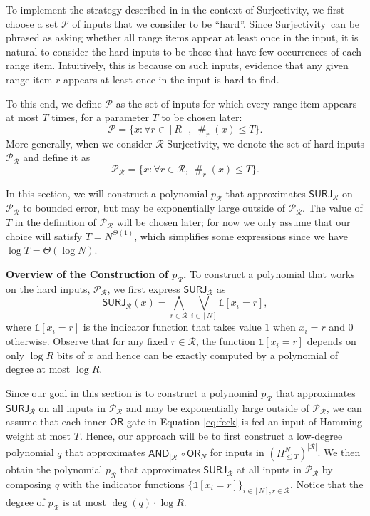\documentclass[11pt, letterpaper, fleqn]{article}
\theoremstyle{plain}
\renewcommand{\P}{\mathcal{P}}
\newcommand{\SURJ}{\mathsf{ SURJ}}
\newcommand{\Surjectivity}{Surjectivity}
\newcommand{\OR}{\mathsf{ OR}}
\newcommand{\id}{{\mathds{1}}}
\newcommand{\Rcal}{\mathcal{R}}
\newcommand{\AND}{\mathsf{AND}}
\newcommand{\fr}{\operatorname{\#}}
\begin{document}
To implement the strategy described in  in the context of \Surjectivity, we first choose a set $\P$ of inputs that we consider to be ``hard''. 
Since \Surjectivity\ can be phrased as asking whether all range items appear at least once in the input, it is natural to consider the hard inputs to be those that have few occurrences of each range item.  Intuitively, this is because on such inputs, evidence that any given range item $r$ appears at least once in the input is hard to find. 

To this end, we define $\mathcal{P}$ as the set of inputs for which every range item appears at most $T$ times, for a parameter $T$ to be chosen later:
\begin{equation}
    \mathcal{P}=\{x:\forall r\in [R],~\fr_r(x)\leq T\}. \label{pdefsurj}
\end{equation}
More generally, when we consider $\Rcal$-\Surjectivity, we denote the set of hard inputs $\P_\Rcal$ and define it as
\begin{equation}
    \P_\Rcal=\{x:\forall r\in \Rcal,~\fr_r(x)\leq T\}.
\end{equation}

In this section, we will construct a polynomial $p_{\mathcal{R}}$ that approximates $\SURJ_\Rcal$ on $\P_\Rcal$ to bounded error, but may be exponentially large outside of $\P_{\Rcal}$. 
The value of $T$ in the definition of $\P_{\Rcal}$ will be chosen later;
for now we only assume that our choice will satisfy $T=N^{\Theta(1)}$, which simplifies some expressions since we have $\log T = \Theta(\log N)$.

\medskip \noindent \textbf{Overview of the Construction of $p_{\mathcal{R}}$.} To construct a polynomial that works on the hard inputs, $\P_\Rcal$, we first express $\SURJ_\Rcal$ as 
\begin{equation}
    \SURJ_\Rcal(x) = \bigwedge_{r\in\Rcal} \bigvee_{i\in[N]} \id[x_i=r], \label{eq:feck}
\end{equation}
where $\id[x_i=r]$ is the indicator function that takes value $1$ when $x_i=r$ and $0$ otherwise. 
Observe that for any fixed $r \in \Rcal$, the function $\id[x_i=r]$ depends on only $\log R$ bits
of $x$ and hence can be exactly computed by a polynomial of degree at most $\log R$. 

Since our goal in this section is to construct a polynomial $p_{\mathcal{R}}$ that approximates $\SURJ_\Rcal$ on all inputs in $\P_{\Rcal}$ and may be exponentially large outside of $\P_{\Rcal}$, we can assume that each inner $\OR$ gate 
in Equation \eqref{eq:feck} is fed an input of Hamming weight at most $T$. 
Hence, our approach will be to first construct a low-degree polynomial $q$ that approximates $\AND_{|\Rcal|} \circ \OR_{N}$ for inputs in $\left(H^N_{\le T}\right)^{|\mathcal{R}|}$.
We then obtain the polynomial $p_{\mathcal{R}}$ that approximates $\SURJ_{\Rcal}$ at all inputs in $\P_{\Rcal}$
by composing $q$ with the indicator functions $\{\id[x_i=r]\}_{i \in [N], r \in \mathcal{R}}$. Notice that the degree of $p_{\mathcal{R}}$ is at most $\deg(q) \cdot \log R$.
\end{document}
